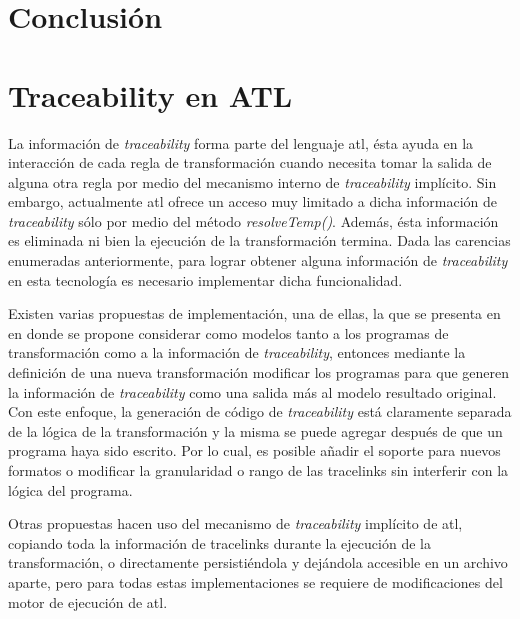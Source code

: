 \documentclass[a4paper,12pt,oneside,spanish]{book}
\begin{document}
\backmatter

\lhead[]{\leftmark}

\chapter{Conclusión}



\appendix
\clearpage
\addappheadtotoc
\appendixpage

\chapter{Traceability en ATL}
\label{cap:ATLTtraceability}

La información de \textit{traceability} forma parte del lenguaje \gls{atl}, ésta ayuda en la interacción de cada regla de transformación cuando necesita tomar la salida de alguna otra regla por medio del mecanismo interno de \textit{traceability} implícito. Sin embargo, actualmente \gls{atl} ofrece un acceso muy limitado a dicha información de \textit{traceability} sólo por medio del método \textsf{\textit{resolveTemp()}}. Además, ésta información es eliminada ni bien la ejecución de la transformación termina. Dada las carencias enumeradas anteriormente, para lograr obtener alguna información de \textit{traceability} en esta tecnología es necesario implementar dicha funcionalidad.

Existen varias propuestas de implementación, una de ellas, la que se presenta en \cite{Jouault} en donde se propone considerar como modelos tanto a los programas de transformación como a la información de \textit{traceability}, entonces mediante la definición de una nueva transformación modificar los programas para que generen la información de \textit{traceability} como una salida más al modelo resultado original. Con este enfoque, la generación de código de \textit{traceability} está claramente separada de la lógica de la transformación y la misma se puede agregar después de que un programa haya sido escrito. Por lo cual, es posible añadir el soporte para nuevos formatos o modificar la granularidad o rango de las tracelinks sin interferir con la lógica del programa.

Otras propuestas hacen uso del mecanismo de \textit{traceability} implícito de \gls{atl}, copiando toda la información de tracelinks durante la ejecución de la transformación, o directamente persistiéndola y dejándola accesible en un archivo aparte, pero para todas estas implementaciones se requiere de modificaciones del motor de ejecución de \gls{atl}.
\end{document}
